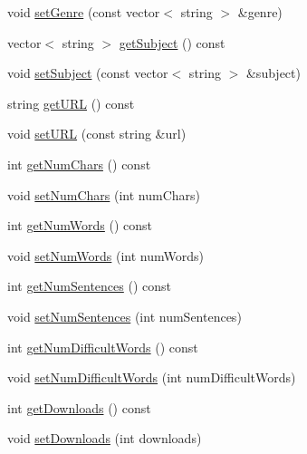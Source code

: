 \begin{DoxyCompactItemize}
\item 
void \hyperlink{classbridges_1_1dataset_1_1_book_a3acd969bba59827fb4e099565e7076bf}{set\+Genre} (const vector$<$ string $>$ \&genre)
\item 
vector$<$ string $>$ \hyperlink{classbridges_1_1dataset_1_1_book_ad68e9b4da931d1a1328fe1ee41acaa58}{get\+Subject} () const
\item 
void \hyperlink{classbridges_1_1dataset_1_1_book_a1473fa37374bbd66561fa02b7ff0d5cf}{set\+Subject} (const vector$<$ string $>$ \&subject)
\item 
string \hyperlink{classbridges_1_1dataset_1_1_book_a5e7dff3aad5acf540f8b0c487fd903a3}{get\+U\+RL} () const
\item 
void \hyperlink{classbridges_1_1dataset_1_1_book_a4d984e8854164f18944198293759319e}{set\+U\+RL} (const string \&url)
\item 
int \hyperlink{classbridges_1_1dataset_1_1_book_af8836440c237f2b8b7a9a0bd11c41d99}{get\+Num\+Chars} () const
\item 
void \hyperlink{classbridges_1_1dataset_1_1_book_af8dea379bd5a00af2257ce565ed6b643}{set\+Num\+Chars} (int num\+Chars)
\item 
int \hyperlink{classbridges_1_1dataset_1_1_book_a087d17660090ce28fbe7245094fb1711}{get\+Num\+Words} () const
\item 
void \hyperlink{classbridges_1_1dataset_1_1_book_afc1d3c8db63d4525e5070e61db5be7e1}{set\+Num\+Words} (int num\+Words)
\item 
int \hyperlink{classbridges_1_1dataset_1_1_book_a7a1b5fef3b464586e635a7444a9e4e41}{get\+Num\+Sentences} () const
\item 
void \hyperlink{classbridges_1_1dataset_1_1_book_a55be4872ed29dc79cdbe56189db6e5e6}{set\+Num\+Sentences} (int num\+Sentences)
\item 
int \hyperlink{classbridges_1_1dataset_1_1_book_aee63718cb1343108d9b7dd66cef208cb}{get\+Num\+Difficult\+Words} () const
\item 
void \hyperlink{classbridges_1_1dataset_1_1_book_a7974e9966b289f897f76dba445f5859e}{set\+Num\+Difficult\+Words} (int num\+Difficult\+Words)
\item 
int \hyperlink{classbridges_1_1dataset_1_1_book_afc1c412c45d2a07b3d5f074e4bbd353a}{get\+Downloads} () const
\item 
void \hyperlink{classbridges_1_1dataset_1_1_book_a998370a590bc5128faa755b5b7c1a85b}{set\+Downloads} (int downloads)
\end{DoxyCompactItemize}


